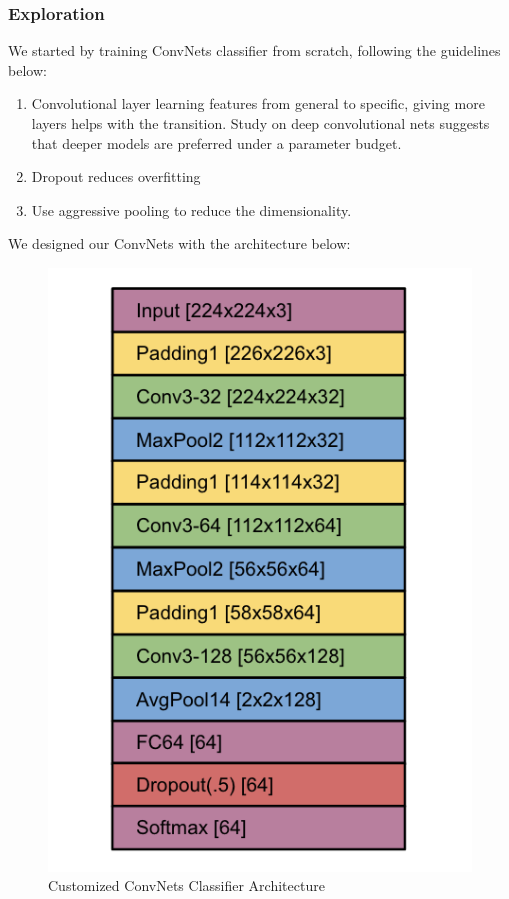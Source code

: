 \documentclass[journal, 10pt]{IEEEtran}
\begin{document}
  \subsubsection{Exploration}
  We started by training ConvNets classifier from scratch, following the guidelines below:
  \begin{enumerate}
    \item Convolutional layer learning features from general to specific, giving more layers helps with the transition. Study on deep convolutional nets suggests that deeper models are preferred under a parameter budget\cite{Deep2013}.
    \item Dropout reduces overfitting \cite{Dropout} \cite{Alex2014}
    \item Use aggressive pooling to reduce the dimensionality.
  \end{enumerate}
  We designed our ConvNets with the architecture below:
  \begin{figure}[H]
    \center
    \includegraphics[scale=0.4]{cnn_arch}
    \caption{Customized ConvNets Classifier Architecture}
    \label{cnn_arch}
  \end{figure}
\end{document}
